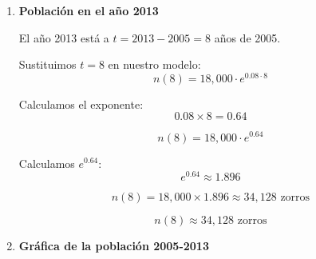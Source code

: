 \documentclass[12pt]{article}
\begin{document}
\begin{enumerate}[label=\alph*.-]
\begin{enumerate}[label=\roman*.]
        El modelo general para crecimiento continuo es:
        \[n(t) = n_0 \cdot e^{rt}\]
        
        Donde:
        \begin{itemize}
            \item $n_0$ = población inicial
            \item $r$ = tasa de crecimiento relativa (como decimal)
            \item $t$ = tiempo transcurrido (en años)
            \item $e \approx 2.718$ (número de Euler)
        \end{itemize}
        
        Datos del problema:
        \begin{itemize}
            \item $n_0 = 18,000$ (población en 2005)
            \item $r = 0.08$ (8\% = 8/100 = 0.08)
            \item $t$ = años después de 2005
        \end{itemize}
        
        Sustituyendo en el modelo:
        \[\boxed{n(t) = 18,000 \cdot e^{0.08t}}\]
        
        \item \textbf{Población en el año 2013}
        
        El año 2013 está a $t = 2013 - 2005 = 8$ años de 2005.
        
        Sustituimos $t = 8$ en nuestro modelo:
        \[n(8) = 18,000 \cdot e^{0.08 \cdot 8}\]
        
        Calculamos el exponente:
        \[0.08 \times 8 = 0.64\]
        
        \[n(8) = 18,000 \cdot e^{0.64}\]
        
        Calculamos $e^{0.64}$:
        \[e^{0.64} \approx 1.896\]
        
        \[n(8) = 18,000 \times 1.896 \approx 34,128 \text{ zorros}\]
        
        \[\boxed{n(8) \approx 34,128 \text{ zorros}}\]
        
        \item \textbf{Gráfica de la población 2005-2013}


\end{enumerate}
\end{enumerate}
\end{document}
